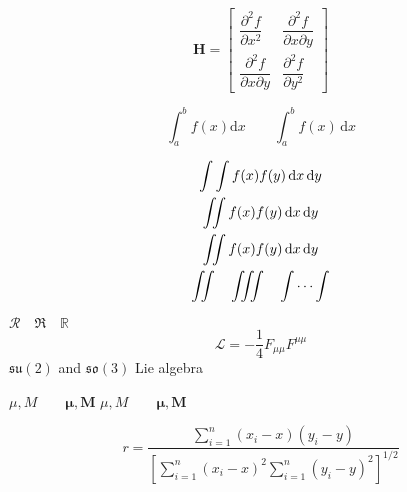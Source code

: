 \documentclass[12pt]{ctexrep}
\begin{document}
\[
\mathbf{H}=
\begin{bmatrix}
\dfrac{\partial^2 f}{\partial x^2} &
\dfrac{\partial^2 f}{\partial x \partial y} \\[8pt]
\dfrac{\partial^2 f}{\partial x \partial y} &
\dfrac{\partial^2 f}{\partial y^2}
\end{bmatrix} 
\]


\[
\int_a^b f(x)\mathrm{d}x
\qquad
\int_a^b f(x)\,\mathrm{d}x  
\]

\newcommand\diff{\,\mathrm{d}}
\begin{gather*}
\int\int f(x)f(y)
\diff x \diff y \\
\int\!\!\!\int
f(x)f(y) \diff x \diff y \\
\iint f(x)f(y) \diff x \diff y \\
\iint\quad \iiint\quad \idotsint
\end{gather*}

$\mathcal{R} \quad \mathfrak{R}
\quad \mathbb{R}$
\[
\mathcal{L}
= -\frac{1}{4}F_{\mu\mu}F^{\mu\mu}  
\]
$\mathfrak{su}(2)$ and $\mathfrak{so}(3)$ Lie algebra


$\mu, M \qquad \boldsymbol{\mu}, \boldsymbol{M}$
$\mu, M \qquad \bm{\mu}, \bm{M}$


\[
r = \frac{\sum_{i=1}^n (x_i- x)(y_i- y)}
{\displaystyle \left[
  \sum_{i=1}^n (x_i-x)^2
  \sum_{i=1}^n (y_i-y)^2
\right]^{1/2}}  
\]
\end{document}
